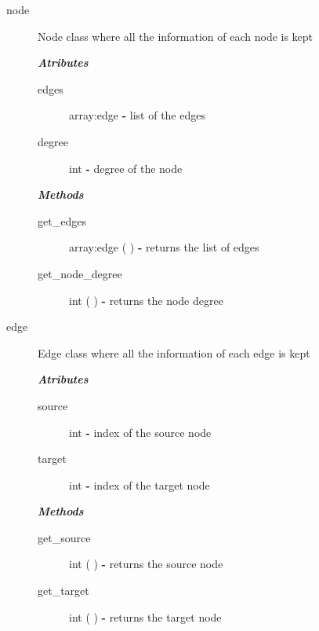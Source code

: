 \documentclass[a4paper,titlepage,11pt]{article}
\begin{document}
\begin{description}
\item [node] Node class where all the information of each node is kept

\textit{ \textbf{Atributes} }
\begin{description}
\item [edges] array:edge \textbf{-} list of the edges
\item [degree] int \textbf{-} degree of the node
\end{description}

\textit{ \textbf{Methods} }
\begin{description}
\item [get\_edges] array:edge ( ) \textbf{-} returns the list of edges
\item [get\_node\_degree] int ( ) \textbf{-} returns the node degree
\end{description}

\item [edge] Edge class where all the information of each edge is kept

\textit{ \textbf{Atributes} }
\begin{description}
\item [source] int \textbf{-} index of the source node
\item [target] int \textbf{-} index of the target node
\end{description}

\textit{ \textbf{Methods} }
\begin{description}
\item [get\_source] int ( ) \textbf{-} returns the source node
\item [get\_target] int ( ) \textbf{-} returns the target node
\end{description}

\end{description}
\end{document}

